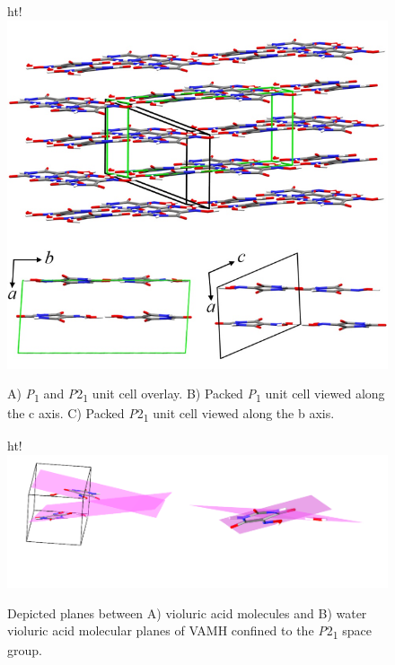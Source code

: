 \begin{figure}{ht!}
  \center
  \includegraphics[width=1\linewidth]{src/figures/VAMH_figures/VAMH_fig4.png}
  \caption{A) \textit{P}\textsubscript{1} and \textit{P}2\textsubscript{1} unit cell overlay. B) Packed \textit{P}\textsubscript{1} unit cell viewed along the c axis. C) Packed \textit{P}2\textsubscript{1} unit cell viewed along the b axis.}
  \label{fig:vamh_p1andp21}
\end{figure}

\begin{figure}{ht!}
  \center
  \includegraphics[width=1\linewidth]{src/figures/VAMH_figures/vamh_fig5.png}
  \caption{Depicted planes between A) violuric acid molecules and B) water violuric acid molecular planes of VAMH confined to the \textit{P}2\textsubscript{1} space group.}
  \label{vamh_planes}
\end{figure}


